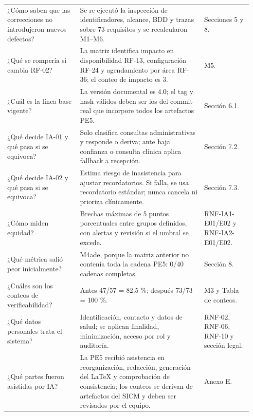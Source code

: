 \documentclass[11pt,a4paper]{article}
\begin{document}
\begin{appendices}
\begin{longtable}{p{4.6cm}p{7.5cm}p{3cm}}
			¿Cómo saben que las correcciones no introdujeron nuevos defectos? & Se re-ejecutó la inspección de identificadores, alcance, BDD y trazas sobre 73 requisitos y se recalcularon M1--M6. & Secciones 5 y 8. \\
			¿Qué se rompería si cambia RF-02? & La matriz identifica impacto en disponibilidad RF-13, configuración RF-24 y agendamiento por área RF-36; el conteo de impacto es 3. & M5. \\
			¿Cuál es la línea base vigente? & La versión documental es 4.0; el tag y hash válidos deben ser los del commit real que incorpore todos los artefactos PE5. & Sección 6.1. \\
			¿Qué decide IA-01 y qué pasa si se equivoca? & Solo clasifica consultas administrativas y responde o deriva; ante baja confianza o consulta clínica aplica fallback a recepción. & Sección 7.2. \\
			¿Qué decide IA-02 y qué pasa si se equivoca? & Estima riesgo de inasistencia para ajustar recordatorios. Si falla, se usa recordatorio estándar; nunca cancela ni prioriza clínicamente. & Sección 7.3. \\
			¿Cómo miden equidad? & Brechas máximas de 5 puntos porcentuales entre grupos definidos, con alertas y revisión si el umbral se excede. & RNF-IA1-E01/E02 y RNF-IA2-E01/E02. \\
			¿Qué métrica salió peor inicialmente? & M4ade, porque la matriz anterior no contenía toda la cadena PE5: 0/40 cadenas completas. & Sección 8. \\
			¿Cuáles son los conteos de verificabilidad? & Antes 47/57 = 82,5 \%; después 73/73 = 100 \%. & M3 y Tabla de conteos. \\
			¿Qué datos personales trata el sistema? & Identificación, contacto y datos de salud; se aplican finalidad, minimización, acceso por rol y auditoría. & RNF-02, RNF-06, RNF-10 y sección legal. \\
			¿Qué partes fueron asistidas por IA? & La PE5 recibió asistencia en reorganización, redacción, generación del LaTeX y comprobación de consistencia; los conteos se derivan de artefactos del SICM y deben ser revisados por el equipo. & Anexo E. \\
			\bottomrule\end{longtable}
		

\end{appendices}
\end{document}
